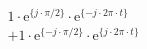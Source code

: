 \correct
\begin{align*}
&  1 \cdot \textrm{e}^{\{ j \cdot \pi/2 \}} \cdot \textrm{e}^{\{-j \cdot 2\pi \cdot t \}} \\
&+ 1 \cdot \textrm{e}^{\{-j \cdot \pi/2 \}} \cdot \textrm{e}^{\{ j \cdot 2\pi \cdot t \}}
\end{align*}
